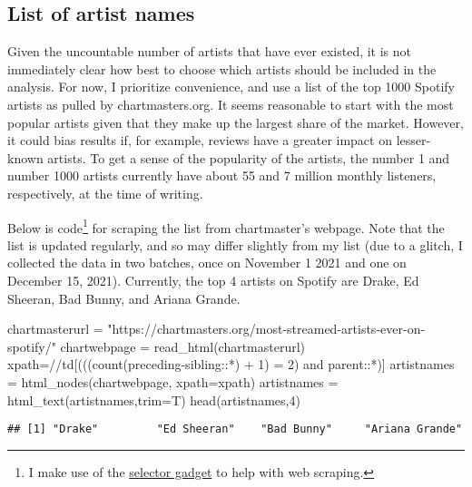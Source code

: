 \documentclass[
  11pt,
]{article}
\newenvironment{Shaded}{\begin{snugshade}}{\end{snugshade}}
\newcommand{\AttributeTok}[1]{\textcolor[rgb]{0.77,0.63,0.00}{#1}}
\newcommand{\DecValTok}[1]{\textcolor[rgb]{0.00,0.00,0.81}{#1}}
\newcommand{\FunctionTok}[1]{\textcolor[rgb]{0.00,0.00,0.00}{#1}}
\newcommand{\NormalTok}[1]{#1}
\newcommand{\OtherTok}[1]{\textcolor[rgb]{0.56,0.35,0.01}{#1}}
\newcommand{\StringTok}[1]{\textcolor[rgb]{0.31,0.60,0.02}{#1}}
\begin{document}
\hypertarget{list-of-artist-names}{%
\subsection{List of artist names}\label{list-of-artist-names}}

Given the uncountable number of artists that have ever existed, it is
not immediately clear how best to choose which artists should be
included in the analysis. For now, I prioritize convenience, and use a
list of the top 1000 Spotify artists as pulled by chartmasters.org. It
seems reasonable to start with the most popular artists given that they
make up the largest share of the market. However, it could bias results
if, for example, reviews have a greater impact on lesser-known artists.
To get a sense of the popularity of the artists, the number 1 and number
1000 artists currently have about 55 and 7 million monthly listeners,
respectively, at the time of writing.

Below is code\footnote{I make use of the
  \href{https://selectorgadget.com/}{selector gadget} to help with web
  scraping.} for scraping the list from chartmaster's webpage. Note that
the list is updated regularly, and so may differ slightly from my list
(due to a glitch, I collected the data in two batches, once on November
1 2021 and one on December 15, 2021). Currently, the top 4 artists on
Spotify are Drake, Ed Sheeran, Bad Bunny, and Ariana Grande.

\begin{Shaded}
\begin{Highlighting}[]
\NormalTok{chartmasterurl }\OtherTok{=} \StringTok{"https://chartmasters.org/most{-}streamed{-}artists{-}ever{-}on{-}spotify/"}
\NormalTok{chartwebpage }\OtherTok{=} \FunctionTok{read\_html}\NormalTok{(chartmasterurl)}
\NormalTok{xpath}\OtherTok{=}\StringTok{\textquotesingle{}//td[(((count(preceding{-}sibling::*) + 1) = 2) and parent::*)]\textquotesingle{}}
\NormalTok{artistnames }\OtherTok{=} \FunctionTok{html\_nodes}\NormalTok{(chartwebpage, }\AttributeTok{xpath=}\NormalTok{xpath)}
\NormalTok{artistnames }\OtherTok{=} \FunctionTok{html\_text}\NormalTok{(artistnames,}\AttributeTok{trim=}\NormalTok{T)}
\FunctionTok{head}\NormalTok{(artistnames,}\DecValTok{4}\NormalTok{)}
\end{Highlighting}
\end{Shaded}

\begin{verbatim}
## [1] "Drake"         "Ed Sheeran"    "Bad Bunny"     "Ariana Grande"
\end{verbatim}
\end{document}
